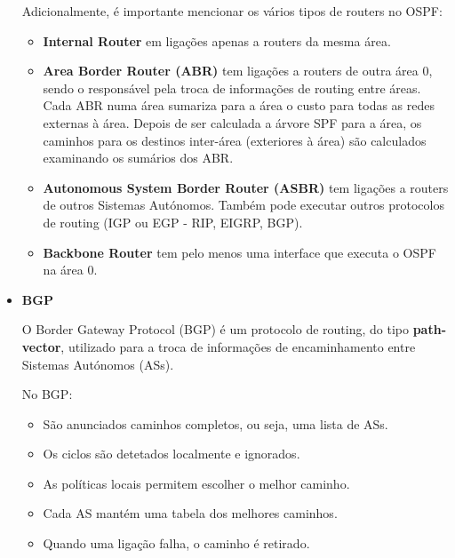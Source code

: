 \documentclass[11pt,english, openright, oneside]{book}
\begin{document}
\begin{itemize}
  \newpage
  Adicionalmente, é importante mencionar os vários tipos de routers no OSPF:
  \begin{itemize}
    \item \textbf{Internal Router} em ligações apenas a routers da mesma área.
    \item \textbf{Area Border Router (ABR)} tem ligações a routers de outra área 0, sendo o responsável pela troca de informações de routing entre áreas. Cada ABR numa área sumariza para a área o custo para todas as redes externas à área. Depois de ser calculada a árvore SPF para a área, os caminhos para os destinos inter-área (exteriores à área) são calculados examinando os sumários dos ABR. 
    \item \textbf{Autonomous System Border Router (ASBR)} tem ligações a routers de outros Sistemas Autónomos. Também pode executar outros protocolos de routing (IGP ou EGP - RIP, EIGRP, BGP). 
    \item \textbf{Backbone Router} tem pelo menos uma interface que executa o OSPF na área 0.
  \end{itemize}
  \vspace{0.2cm}

  \item \textbf{BGP}
  \vspace{0.2cm}

  O Border Gateway Protocol (BGP) é um protocolo de routing, do tipo \textbf{path-vector}, utilizado para a troca de informações de encaminhamento entre Sistemas Autónomos (ASs).
  \vspace{0.2cm}

  No BGP:
  \begin{itemize}
    \item São anunciados caminhos completos, ou seja, uma lista de ASs.
    \item Os ciclos são detetados localmente e ignorados.
    \item As políticas locais permitem escolher o melhor caminho.
    \item Cada AS mantém uma tabela dos melhores caminhos.
    \item Quando uma ligação falha, o caminho é retirado.
  \end{itemize}
  \vspace{0.2cm}


\end{itemize}
\end{document}
